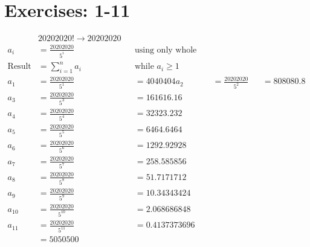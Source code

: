 \documentclass{article}
\begin{document}
\section{Exercises: 1-11}
{
{
\begin{align*}
&20202020! \rightarrow 20202020\\
a_i &= \frac {20202020}{5^i} && \text{using only whole numbers}\\ 
\text{Result} &= \sum_{i=1}^{n} a_i &&\text{while $a_i \geq 1$}\\
a_1 &= \frac {20202020}{5^1} &&= 4040404 
a_2 &= \frac {20202020}{5^2} &&= 808080.8  \\
a_3 &= \frac {20202020}{5^3} &&= 161616.16 \\
a_4 &= \frac {20202020}{5^4} &&= 32323.232  \\
a_5 &= \frac {20202020}{5^5} &&= 6464.6464\\
a_6 &= \frac {20202020}{5^6} &&= 1292.92928  \\
a_7 &= \frac {20202020}{5^7} &&= 258.585856 \\
a_8 &= \frac {20202020}{5^8} &&= 51.7171712 \\
a_9 &= \frac {20202020}{5^9} &&= 10.34343424 \\
a_10 &= \frac {20202020}{5^{10} } &&= 2.068686848 \\
a_11 &= \frac {20202020}{5^{11}} &&= 0.4137373696 \\
&=5050500
\end{align*}


\newpage
}
}
\end{document}
